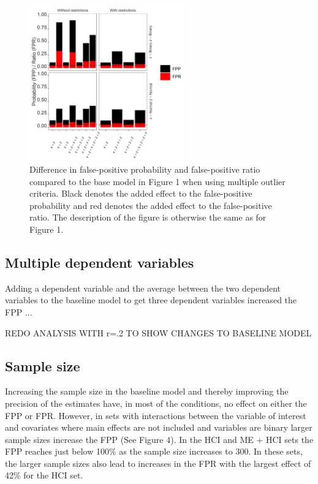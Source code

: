 \begin{figure}[hbt!]
\includegraphics[width=0.6\textwidth]{R/Analysis/Result/Figures/Figure1B.jpeg}
\centering
\caption{Difference in false-positive probability and false-positive ratio compared to the base model in Figure 1 when using multiple outlier criteria. Black denotes the added effect to the false-positive probability and red denotes the added effect to the false-positive ratio.  The description of the figure is otherwise the same as for Figure 1.}
\label{fig:mainfigure}
\end{figure}

\subsection{Multiple dependent variables}
Adding a dependent variable and the average between the two dependent variables to the baseline model to get three dependent variables increased the FPP ...

REDO ANALYSIS WITH r=.2 TO SHOW CHANGES TO BASELINE MODEL

\subsection{Sample size}
Increasing the sample size in the baseline model and thereby improving the precision of the estimates have, in most of the conditions, no effect on either the FPP or FPR. However, in sets with interactions between the variable of interest and covariates where main effects are not included and variables are binary larger sample sizes increase the FPP (See Figure 4). In the HCI and ME + HCI sets the FPP reaches just below 100\% as the sample size increases to 300. In these sets, the larger sample sizes also lead to increases in the FPR with the largest effect of 42\% for the HCI set.  



